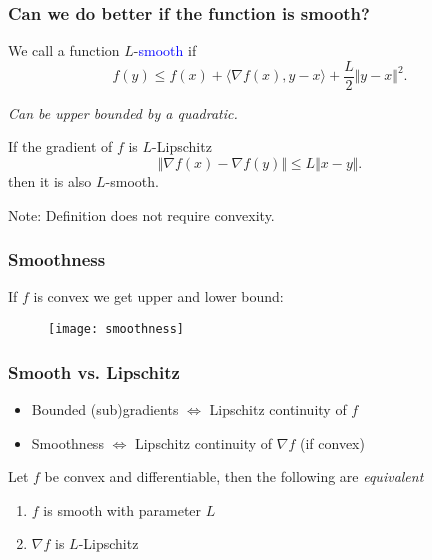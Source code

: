 \documentclass{beamer}
\begin{document}
\begin{frame}
  \frametitle{Can we do better if the function is smooth?}
  \begin{definition}
    We call a function $L$-\textcolor{blue}{smooth} if
    \begin{equation}
      f(y) \le f(x) + \langle \nabla f(x), y-x \rangle + \frac{L}{2} \Vert y-x \Vert^2.
    \end{equation}
  \end{definition}
  \begin{center}
    \textit{Can be upper bounded by a quadratic.}
  \end{center}
  \begin{lemma}%
    If the gradient of $f$ is $L$-Lipschitz
    \begin{equation}
      \Vert \nabla f(x)- \nabla f(y) \Vert \le L \Vert x-y \Vert.
    \end{equation}
    then it is also $L$-smooth.
  \end{lemma}
  Note: Definition does not require convexity.
\end{frame}


\begin{frame}
  \frametitle{Smoothness}
  If $f$ is convex we get upper and lower bound:

  \begin{figure}[ht]
    \centering
    \texttt{[image: smoothness]}
  \end{figure}
\end{frame}


\begin{frame}
  \frametitle{Smooth vs. Lipschitz}
  \begin{itemize}
    \item Bounded (sub)gradients $\Leftrightarrow$ Lipschitz continuity of $f$
    \item Smoothness $\Leftrightarrow$ Lipschitz continuity of $\nabla f$ (if convex)
  \end{itemize}

  \begin{lemma}%
    Let $f$ be convex and differentiable, then the following are \textit{equivalent}
    \begin{enumerate}
      \item $f$ is smooth with parameter $L$
      \item $\nabla f$ is $L$-Lipschitz
    \end{enumerate}
  \end{lemma}
\end{frame}
\end{document}
